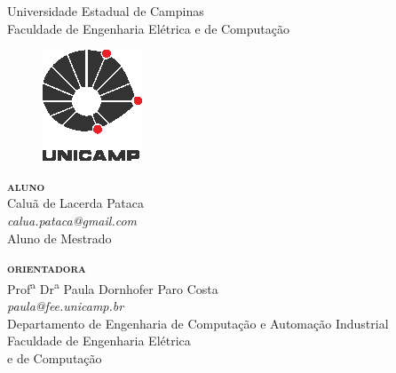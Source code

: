\documentclass[a4paper,11pt,titlepage,singlespacing]{article}
\begin{document}
\begin{titlepage}

    \begin{center}
        Universidade Estadual de Campinas \\
         Faculdade de Engenharia Elétrica e de Computação \\
     \begin{figure}[htb]
         \centering
         \includegraphics[width=.1\linewidth]{fig/unicamp.eps}
         \end{figure}
     \end{center}


    
       \vspace{2cm}
    
    

     
     
     \vspace{4.25cm}
     
     
     \hspace*{0.5\textwidth}\begin{minipage}{0.5\textwidth}
       \begin{flushleft}     

           \textbf{\textsc{aluno}} \\ Caluã de Lacerda Pataca\\ 
           \textit{calua.pataca@gmail.com} \\ \vspace{0.2cm}
           Aluno de Mestrado

           \vspace{0.8cm}

           \textbf{\textsc{orientadora}} \\ Prof\textsuperscript{a} Dr\textsuperscript{a} Paula Dornhofer Paro Costa\\ 
           \textit{paula@fee.unicamp.br} \\ \vspace{0.2cm}
           Departamento de Engenharia de Computação e Automação Industrial \\ \vspace{0.2cm}
           Faculdade de Engenharia Elétrica \\ e de Computação



\end{flushleft}
\end{minipage}
\end{titlepage}
\end{document}
